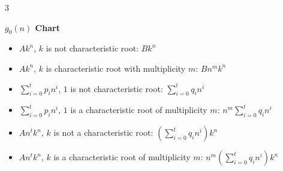 \documentclass[10pt, landscape]{article}
\begin{document}
\begin{multicols*}{3}

\textbf{$g_0(n)$ Chart}
\begin{itemize}
    \item $Ak^n$, $k$ is not characteristic root: $Bk^n$
    \item $Ak^n$, $k$ is characteristic root with multiplicity $m$: $Bn^mk^n$
    \item $\sum_{i=0}^tp_in^i$, $1$ is not characteristic root: $\sum_{i=0}^tq_in^i$
    \item $\sum_{i=0}^tp_in^i$, $1$ is a characteristic root of multiplicity $m$: $n^m\sum_{i=0}^tq_in^i$
    \item $An^tk^n$, $k$ is not a characteristic root: $(\sum_{i=0}^tq_in^i)k^n$
    \item $An^tk^n$, $k$ is a characteristic root of multiplicity $m$: $n^m(\sum_{i=0}^tq_in^i)k^n$
\end{itemize}


\end{multicols*}
\end{document}
